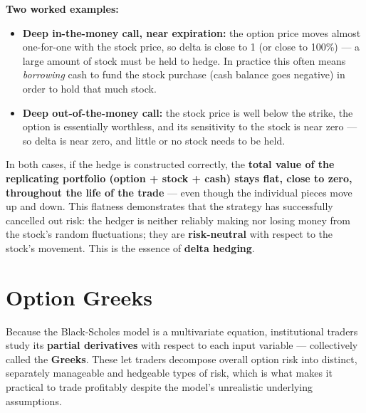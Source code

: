 \documentclass[12pt,openany]{book}
\theoremstyle{definition}
\theoremstyle{remark}
\begin{document}
\textbf{Two worked examples:}

\begin{itemize}
\item \textbf{Deep in-the-money call, near expiration:} the option price moves almost one-for-one with the stock price, so delta is close to 1 (or close to 100\%) --- a large amount of stock must be held to hedge. In practice this often means \emph{borrowing} cash to fund the stock purchase (cash balance goes negative) in order to hold that much stock.


\item \textbf{Deep out-of-the-money call:} the stock price is well below the strike, the option is essentially worthless, and its sensitivity to the stock is near zero --- so delta is near zero, and little or no stock needs to be held.


\end{itemize}

In both cases, if the hedge is constructed correctly, the \textbf{total value of the replicating portfolio (option + stock + cash) stays flat, close to zero, throughout the life of the trade} --- even though the individual pieces move up and down. This flatness demonstrates that the strategy has successfully cancelled out risk: the hedger is neither reliably making nor losing money from the stock's random fluctuations; they are \textbf{risk-neutral} with respect to the stock's movement. This is the essence of \textbf{delta hedging}.

\section{Option Greeks}

Because the Black-Scholes model is a multivariate equation, institutional traders study its \textbf{partial derivatives} with respect to each input variable --- collectively called the \textbf{Greeks}. These let traders decompose overall option risk into distinct, separately manageable and hedgeable types of risk, which is what makes it practical to trade profitably despite the model's unrealistic underlying assumptions.
\end{document}
